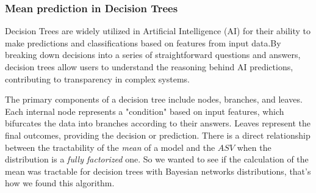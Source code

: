 



\newpage


\begin{comment}
    Quiero remover algunos ejes de la red bayesiana para que me quede un árbol.
Heurística para ver que ejes remover:
¿El eje que me genere un ciclo + genere una menor divergencia entre las distribuciones marginalizadas?
La idea sería fijarse que distribuciones me quedan al removerlo, luego comparar cuáles son las que divergen menos entre sí (criterio KL por ejemplo) y elegir ese eje. 
\end{comment}

\subsubsection{Mean prediction in Decision Trees}

Decision Trees are widely utilized in Artificial Intelligence (AI) for their ability to make predictions and classifications based on features from input data.By breaking down decisions into a series of straightforward questions and answers, decision trees allow users to understand the reasoning behind AI predictions, contributing to transparency in complex systems.

The primary components of a decision tree include nodes, branches, and leaves. Each internal node represents a "condition" based on input features, which bifurcates the data into branches according to their answers. Leaves represent the final outcomes, providing the decision or prediction. There is a direct relationship between the tractability of the \emph{mean} of a model and the $ASV$  when the distribution is a \emph{fully factorized} one. So we wanted to see if the calculation of the mean was tractable for decision trees with Bayesian networks distributions, that's how we found this algorithm. \\

